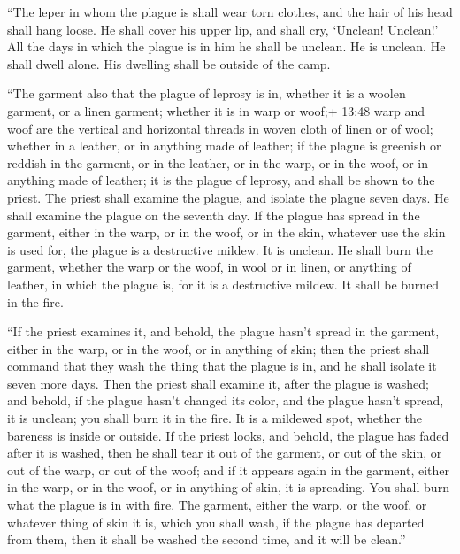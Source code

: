 ``The leper in whom the plague is shall wear torn clothes,
and the hair of his head shall hang loose. He shall cover his upper lip,
and shall cry, `Unclean! Unclean!'  All the days in which
the plague is in him he shall be unclean. He is unclean. He shall dwell
alone. His dwelling shall be outside of the camp.

 ``The garment also that the plague of leprosy is in,
whether it is a woolen garment, or a linen garment; 
whether it is in warp or woof;+ 13:48 warp and woof are the vertical and
horizontal threads in woven cloth of linen or of wool; whether in a
leather, or in anything made of leather;  if the plague is
greenish or reddish in the garment, or in the leather, or in the warp,
or in the woof, or in anything made of leather; it is the plague of
leprosy, and shall be shown to the priest.  The priest
shall examine the plague, and isolate the plague seven days.
 He shall examine the plague on the seventh day. If the
plague has spread in the garment, either in the warp, or in the woof, or
in the skin, whatever use the skin is used for, the plague is a
destructive mildew. It is unclean.  He shall burn the
garment, whether the warp or the woof, in wool or in linen, or anything
of leather, in which the plague is, for it is a destructive mildew. It
shall be burned in the fire.

 ``If the priest examines it, and behold, the plague hasn't
spread in the garment, either in the warp, or in the woof, or in
anything of skin;  then the priest shall command that they
wash the thing that the plague is in, and he shall isolate it seven more
days.  Then the priest shall examine it, after the plague
is washed; and behold, if the plague hasn't changed its color, and the
plague hasn't spread, it is unclean; you shall burn it in the fire. It
is a mildewed spot, whether the bareness is inside or outside.
 If the priest looks, and behold, the plague has faded
after it is washed, then he shall tear it out of the garment, or out of
the skin, or out of the warp, or out of the woof;  and if
it appears again in the garment, either in the warp, or in the woof, or
in anything of skin, it is spreading. You shall burn what the plague is
in with fire.  The garment, either the warp, or the woof,
or whatever thing of skin it is, which you shall wash, if the plague has
departed from them, then it shall be washed the second time, and it will
be clean.''


